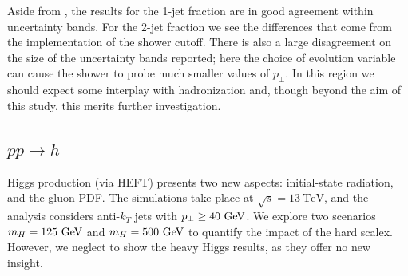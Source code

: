 Aside from \Herwig \QTilde, the results for the 1-jet fraction are in good
agreement within uncertainty bands. For the 2-jet fraction we see the
differences that come from the implementation of the shower cutoff. There is
also a large disagreement on the size of the uncertainty bands reported; here
the choice of evolution variable can cause the shower to probe much smaller
values of $p_\perp$. In this region we should expect some interplay with
hadronization and, though beyond the aim of this study, this merits further
investigation.

\subsection{$pp\to h$}
\label{sec:psunc:results:h}
Higgs production (via HEFT) presents two new aspects: initial-state radiation,
and the gluon PDF. The simulations take place at $\sqrt{s}=13~\mathrm{TeV}$,
and the analysis considers anti-$k_T$ jets with $p_\perp\geq 40~\textrm{GeV}$. We
explore two scenarios $m_H=125~\textrm{GeV}$ and $m_H=500~\textrm{GeV}$ to quantify the impact of
the hard scalex. However, we neglect to show the heavy Higgs results, as they
offer no new insight.

